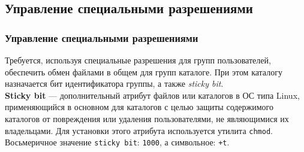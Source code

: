 \documentclass{beamer}
\begin{document}
\subsection{Управление специальными разрешениями}
\begin{frame}[plain]
	\frametitle{Управление специальными разрешениями}
	Требуется, используя специальные разрешения для групп пользователей, обеспечить обмен файлами в общем для групп каталоге. При этом каталогу назначается бит идентификатора группы, а также \textit{sticky bit}.\\
	\textbf{Sticky bit} — дополнительный атрибут файлов или каталогов в ОС типа Linux, применяющийся в основном для каталогов с целью защиты содержимого каталогов от повреждения или удаления пользователями, не являющимися их владельцами. Для установки этого атрибута используется утилита \texttt{chmod}. Восьмеричное значение \texttt{sticky bit}: \texttt{1000}, а символьное: \texttt{+t}.
\end{frame}
\end{document}
